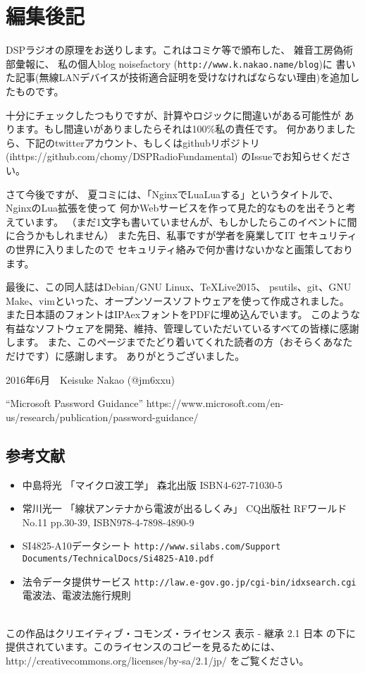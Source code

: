 \section*{編集後記}
DSPラジオの原理をお送りします。これはコミケ等で頒布した、
雑音工房偽術部彙報に、
私の個人blog noisefactory (\texttt{http://www.k.nakao.name/blog})に
書いた記事(無線LANデバイスが技術適合証明を受けなければならない理由)を追加したものです。

十分にチェックしたつもりですが、計算やロジックに間違いがある可能性が
あります。もし間違いがありましたらそれは100\%私の責任です。
何かありましたら、下記のtwitterアカウント、もしくはgithubリポジトリ
(ihttps://github.com/chomy/DSPRadioFundamental)
のIssueでお知らせください。


さて今後ですが、
夏コミには、「NginxでLuaLuaする」というタイトルで、NginxのLua拡張を使って
何かWebサービスを作って見た的なものを出そうと考えています。
（まだ1文字も書いていませんが、もしかしたらこのイベントに間に合うかもしれません）
また先日、私事ですが学者を廃業してIT セキュリティの世界に入りましたので
セキュリティ絡みで何か書けないかなと画策しております。

最後に、この同人誌はDebian/GNU Linux、\TeX Live2015、
psutils、git、GNU Make、vimといった、オープンソースソフトウェアを使って作成されました。
また日本語のフォントはIPAexフォントをPDFに埋め込んでいます。
このような有益なソフトウェアを開発、維持、管理していただいているすべての皆様に感謝します。
また、このページまでたどり着いてくれた読者の方（おそらくあなただけです）に感謝します。
ありがとうございました。

\begin{flushright}
2016年6月　Keisuke Nakao (@jm6xxu) 
\end{flushright}
\clearpage


\begin{thebibliography}{9}
	 ``Microsoft Password Guidance'' https://www.microsoft.com/en-us/research/publication/password-guidance/
\end{thebibliography}
\subsection*{参考文献}
\begin{itemize}
  \item 中島将光
    「マイクロ波工学」 森北出版 ISBN4-627-71030-5
  \item 常川光一
    「線状アンテナから電波が出るしくみ」 CQ出版社 RFワールド No.11 pp.30-39, ISBN978-4-7898-4890-9

  \item 
    SI4825-A10データシート \texttt{http://www.silabs.com/Support Documents/TechnicalDocs/Si4825-A10.pdf}
	\item
	法令データ提供サービス \texttt{http://law.e-gov.go.jp/cgi-bin/idxsearch.cgi} 電波法、電波法施行規則
   \end{itemize}
\clearpage
\mbox{}
\vspace{36em}\\
この作品はクリエイティブ・コモンズ・ライセンス 表示 - 継承 2.1 日本 の下に提供されています。このライセンスのコピーを見るためには、http://creativecommons.org/licenses/by-sa/2.1/jp/ をご覧ください。
